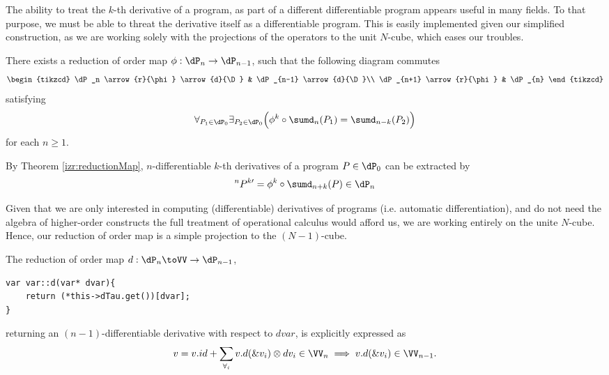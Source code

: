 \label{sec:orderReduction}
 
The ability to treat the $k$-th derivative of a program, as part of a different differentiable program appears useful in many fields. To that purpose, we must be able to threat the derivative itself as a differentiable program. This is easily implemented given our simplified construction, as we are working solely with the projections of the operators to the unit $N$-cube, which eases our troubles.

\begin{izrek}\label{izr:reductionMap}
There exists a reduction of order map $\phi:\dP_n\to \dP_{n-1}$, such that the
following  diagram commutes
\begin{equation}\label{eq:reductionMap}
\begin{tikzcd}
  \dP_n \arrow{r}{\phi} \arrow{d}{\D} & 
  \dP_{n-1} \arrow{d}{\D}\\
  \dP_{n+1} \arrow{r}{\phi} & 
  \dP_{n}
\end{tikzcd}
\end{equation}
satisfying
\begin{equation}
\forall_{P_1\in\dP_0}\exists_{P_2\in\dP_0}\Big(\phi^k\circ \sumd_n(P_1)=\sumd_{n-k}(P_2)\Big)
\end{equation}
for each $n\ge 1$.
\end{izrek}  
\begin{corollary}\label{cor:extraxtDerivatives}
By Theorem \ref{izr:reductionMap}, $n$-differentiable $k$-th derivatives of a program $P\in\dP_0$ can be extracted by
\begin{equation}
^{n}P^{k\prime}=\phi^k\circ \sumd_{n+k}(P)\in\dP_n
\end{equation}
\end{corollary}

Given that we are only interested in computing (differentiable) derivatives of programs (i.e. automatic differentiation), and do not need the algebra of higher-order constructs the full treatment of operational calculus would afford us, we are working entirely on the unite $N$-cube. Hence, our reduction of order map is a simple projection to the $(N-1)$-cube.

The reduction of order map $d:\dP_n\toVV\to\dP_{n-1}$,
\begin{lstlisting}
var var::d(var* dvar){
    return (*this->dTau.get())[dvar];
}
\end{lstlisting}
returning an $(n-1)$-differentiable derivative with respect to $dvar$, is explicitly expressed as
\begin{equation}
v=v.id+\sum\limits_{\forall_i}v.d(\&v_i)\otimes dv_i \in\VV_n\implies v.d(\&v_i)\in\VV_{n-1}.
\end{equation}

